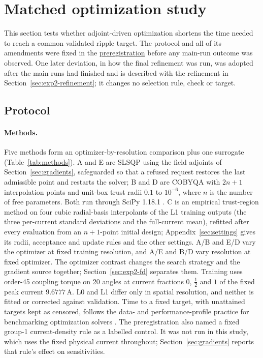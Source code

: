 \section{Matched optimization study}\label{sec:optimization}
This section tests whether adjoint-driven optimization shortens the time
needed to reach a common validated ripple target. The protocol and all of
its amendments were fixed in the
\href{https://github.com/rjwalters/geode-fem/issues/1185}{preregistration}
before any main-run outcome was observed. One later deviation, in how the
final refinement was run, was adopted after the main runs had finished and
is described with the refinement in Section~\ref{sec:exp2-refinement}; it
changes no selection rule, check or target.

\subsection{Protocol}
\paragraph{Methods.}
Five methods form an optimizer-by-resolution comparison plus one
surrogate (Table~\ref{tab:methods}). A and E are SLSQP
\citep{kraft1988} using the field adjoints of Section~\ref{sec:gradients},
safeguarded so that a refused request restores the last admissible point
and restarts the solver; B and D are COBYQA \citep{ragonneau2022} with $2n+1$ interpolation points
and unit-box trust radii $0.1$ to $10^{-6}$, where $n$ is the number of free
parameters. Both run through SciPy 1.18.1 \citep{virtanen2020scipy}. C is
an empirical trust-region method on four cubic radial-basis interpolants
of the L1 training outputs (the three per-current standard deviations and
the full-current mean), refitted after every evaluation from an $n+1$-point
initial design; Appendix~\ref{sec:settings} gives its radii, acceptance
and update rules and the other settings. A/B and E/D vary the optimizer at fixed training resolution,
and A/E and B/D vary resolution at fixed optimizer. The optimizer contrast
changes the search strategy and the gradient source together;
Section~\ref{sec:exp2-fd} separates them. Training uses order-45 coupling torque
on 20 angles at current fractions $0$, $\tfrac12$ and $1$ of the fixed peak
current $9.6777\,\mathrm{A}$. L0 and L1 differ only in spatial resolution,
and neither is fitted or corrected against validation. Time to a fixed
target, with unattained targets kept as censored, follows the data- and performance-profile
practice for benchmarking optimization solvers \citep{more2009benchmarking,dolan2002benchmarking}.
The preregistration also named a fixed group-1 current-density rule as a
labelled control. It was not run in this study, which uses the fixed
physical current throughout; Section~\ref{sec:gradients} reports that
rule's effect on sensitivities.

